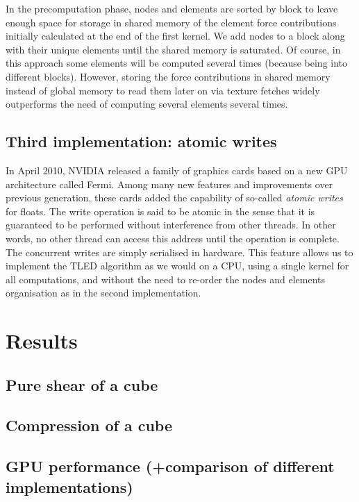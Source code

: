 In the precomputation phase, nodes and elements are sorted by block to leave enough space for storage in shared memory of the element force contributions initially calculated at the end of the first kernel. We add nodes to a block along with their unique elements until the shared memory is saturated. Of course, in this approach some elements will be computed several times (because being into different blocks). However, storing the force contributions in shared memory instead of global memory to read them later on via texture fetches widely outperforms the need of computing several elements several times. 


	\subsection{Third implementation: atomic writes}
In April 2010, NVIDIA released a family of graphics cards based on a new GPU architecture called Fermi. Among many new features and improvements over previous generation, these cards added the capability of so-called \emph{atomic writes} for floats. The write operation is said to be atomic in the sense that it is guaranteed to be performed without interference from other threads. In other words, no other thread can access this address until the operation is complete. The concurrent writes are simply serialised in hardware. This feature allows us to implement the TLED algorithm as we would on a CPU, using a single kernel for all computations, and without the need to re-order the nodes and elements organisation as in the second implementation. 


	
\section{Results}	
	\subsection{Pure shear of a cube}
	\subsection{Compression of a cube}
	\subsection{GPU performance (+comparison of different implementations)}
